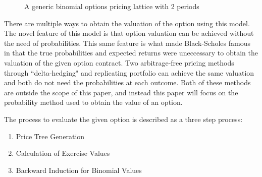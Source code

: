 \documentclass[12pt, letterpaper]{article}\usepackage{float}
\begin{document}
\begin{figure}[H]
  \caption{A generic binomial options pricing lattice with 2 periods}
  \label{fig:genericlattice}
\end{figure}

\pagebreak
There are multiple ways to obtain the valuation of the option using this model.
The novel feature of this model is that option valuation can be achieved without the need of probabilities.
This same feature is what made Black-Scholes famous in that the true probabilities and expected returns were uneccessary to obtain the valuation of the given option contract\cite{brigidavideo}.
Two arbitrage-free pricing methods through ``delta-hedging" and replicating portfolio can achieve the same valuation and both do not need the probabilities at each outcome.
Both of these methods are outside the scope of this paper, and instead this paper will focus on the probability method used to obtain the value of an option.

\bigskip

The process to evaluate the given option is described as a three step process\cite{bopmwikipedia}:
\begin{enumerate}[leftmargin=2\parindent]
  \item Price Tree Generation
  \item Calculation of Exercise Values
  \item Backward Induction for Binomial Values
\end{enumerate}
\end{document}
